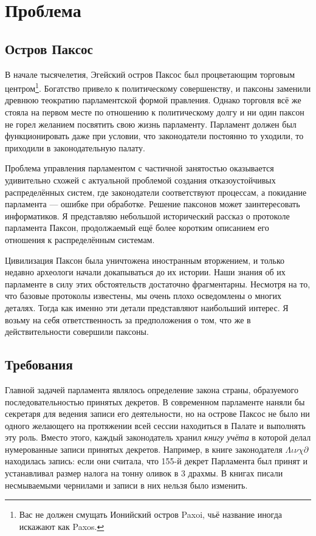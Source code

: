 \documentclass[12pt, a4paper]{article} %
\begin{document}
\newpage
\section{Проблема}
\subsection{Остров Паксос}

В начале тысячелетия, Эгейский остров Паксос был процветающим торговым центром\footnote{Вас не должен смущать Ионийский остров Paxoi, чьё название иногда искажают как Paxos.}. Богатство привело к политическому совершенству, и паксоны заменили древнюю теократию парламентской формой правления. Однако торговля всё же стояла на первом месте по отношению к политическому долгу и ни один паксон не горел желанием посвятить свою жизнь парламенту. Парламент должен был функционировать даже при условии, что законодатели постоянно то уходили, то приходили в законодательную палату.

Проблема управления парламентом с частичной занятостью оказывается удивительно схожей с актуальной проблемой создания отказоустойчивых распределённых систем, где законодатели соответствуют процессам, а покидание парламента --- ошибке при обработке. Решение паксонов может заинтересовать информатиков. Я представляю небольшой исторический рассказ о протоколе парламента Паксон, продолжаемый ещё более коротким описанием его отношения к распределённым системам.

Цивилизация Паксон была уничтожена иностранным вторжением, и только недавно археологи начали докапываться до их истории. Наши знания об их парламенте в силу этих обстоятельств достаточно фрагментарны. Несмотря на то, что базовые протоколы известены, мы очень плохо осведомлены о многих деталях. Тогда как именно эти детали представляют наибольший интерес. Я возьму на себя ответственность за предположения о том, что же в действительности совершили паксоны.

\subsection{Требования}

Главной задачей парламента являлось определение закона страны, образуемого последовательностью принятых декретов. В современном парламенте наняли бы секретаря для ведения записи его деятельности, но на острове Паксос не было ни одного желающего на протяжении всей сессии находиться в Палате и выполнять эту роль. Вместо этого, каждый законодатель хранил \textit{книгу учёта} в которой делал нумерованные записи принятых декретов. Например, в книге законодателя $\Lambda\iota\nu\chi\partial$ находилась запись:
если они считала, что 155-й декрет Парламента был принят и устанавливал размер налога на тонну оливок в 3 драхмы. В книгах писали несмываемыми чернилами и записи в них нельзя было изменить.
\end{document}

